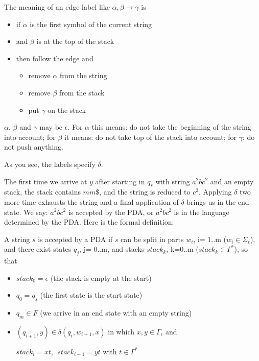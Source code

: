 The meaning of an edge label like $\alpha,\beta \rightarrow \gamma$ is

\begin{itemize}
\item if $\alpha$ is the first symbol of the current string
\item and $\beta$ is at the top of the stack
\item then follow the edge and
\begin{itemize}
\item remove $\alpha$ from the string
\item remove $\beta$ from the stack
\item put $\gamma$ on the stack
\end{itemize}

\end{itemize}

$\alpha$, $\beta$ and $\gamma$ may be $\epsilon$. For $\alpha$ this
means: do not take the beginning of the string into account; for
$\beta$ it means: do not take top of the stack into account; for
$\gamma$: do not push anything.

As you see, the labels specify $\delta$.

The first time we arrive at $y$ after starting in $q_s$ with string
$a^2bc^2$ and an empty stack, the stack contains $mm\$$, and the string
is reduced to $c^2$. Applying $\delta$ two more time exhausts the
string and a final application of $\delta$ brings us in the end
state. We say: $a^2bc^2$ is accepted by the PDA, or $a^2bc^2$ is in
the language determined by the PDA. Here is the formal definition:

\begin{definition}
A string $s$ is accepted by a PDA if $s$ can be split in parts
$w_i$, i= 1..m ($w_i \in \Sigma_\epsilon$), and there exist states
 $q_j$, j= 0..m, and stacks $stack_k$, k=0..m ($stack_k
\in \Gamma^*$), so that
\begin{itemize}
\item $stack_0 = \epsilon$  (the stack is empty at the start)
\item $q_0 = q_s$ (the first state is the start state)
\item $q_m \in F$ (we arrive in an end state with an empty string)
\item $(q_{i+1},y) \in \delta(q_i,w_{i+1},x)$ in which  $x,y \in
\Gamma_\epsilon$ and

$stack_i = xt,~~stack_{i+1} = yt$ with $t \in \Gamma^*$
\end{itemize}
\end{definition}

